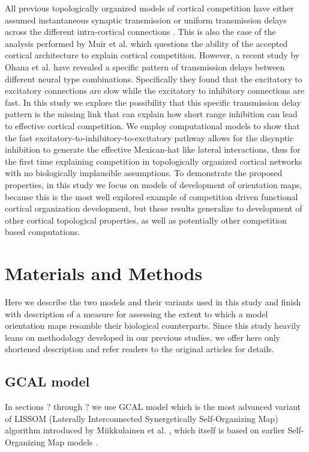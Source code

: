 \documentclass[a4paper,10pt]{article}
\begin{document}
All previous topologically organized models of cortical competition have either assumed instantaneous synaptic transmission \cite{Kang2003,Levy2011,VonderMalsburg1973,CMVC} or uniform transmission delays across the different intra-cortical connections \cite{?}. This is also the case of the analysis performed by Muir et al. \cite{Muir2014} which questions the ability of the accepted cortical architecture to explain cortical competition. However, a recent study by Ohana et al. \cite{Ohana2012} have revealed a specific pattern of transmission delays between different neural type combinations. Specifically they found that the excitatory to excitatory connections are slow while the excitatory to inhibitory connections are fast. In this study we explore the 
possibility that this specific transmission delay pattern is the missing link that can explain how short range inhibition can lead 
to effective cortical competition. We employ computational models to show that the fast excitatory-to-inhibitory-to-excitatory pathway allows for the disynptic inhibition to generate the effective Mexican-hat like lateral interactions, thus for the first time 
explaining competition in topologically organized cortical networks with no biologically implausible assumptions. To demonstrate the
proposed properties, in this study we focus on models of development of orientation maps, because this is the most well explored
example of competition driven functional cortical organization development, but these results generalize to development of other
cortical topological properties, as well as potentially other competition based computations.


\section{Materials and Methods}

Here we describe the two models and their variants used in this study and finish with description of a measure
for assessing the extent to which a model orientation maps resamble their biological counterparts. Since this study heavily leans on methodology 
developed in our previous studies, we offer here only shortened description and refer readers to the original articles for details.

\subsection{GCAL model}

In sections ? through ? we use GCAL model \cite{Stevens2013}  which is the most advanced variant of LISSOM 
(Laterally Interconnected Synergetically Self-Organizing Map) algorithm introduced by Miikkulainen et al. \cite{CMVC}, 
which itself is based on earlier Self-Organizing Map models \cite{Kohonen1982}.
\end{document}
